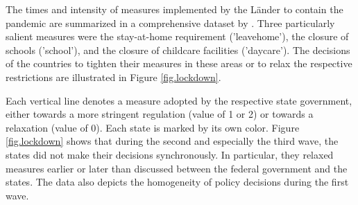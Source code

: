 \documentclass[12pt, abstract=true]{scrartcl}
\begin{document}
The times and intensity of measures implemented by the Länder to contain the pandemic are summarized in a comprehensive dataset by \cite{Steinmetz2022}. Three particularly salient measures were the stay-at-home requirement ('leavehome'), the closure of schools ('school'), and the closure of childcare facilities ('daycare'). The decisions of the countries to tighten their measures in these areas or to relax the respective restrictions are illustrated in Figure \ref{fig.lockdown}.

Each vertical line denotes a measure adopted by the respective state government, either towards a more stringent regulation (value of 1 or 2) or towards a relaxation (value of 0). Each state is marked by its own color. Figure \ref{fig.lockdown} shows that during the second and especially the third wave, the states did not make their decisions synchronously. In particular, they relaxed measures earlier or later than discussed between the federal government and the states. The data also depicts the homogeneity of policy decisions during the first wave. 


\end{document}
